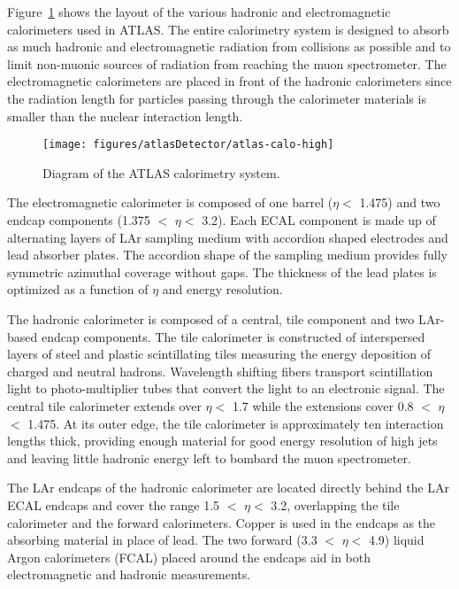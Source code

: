 Figure~\ref{fig:atlasCalorimeters} shows the layout of the various hadronic and electromagnetic calorimeters used in ATLAS. The entire calorimetry system is designed to absorb as much hadronic and electromagnetic radiation from collisions as possible and to limit non-muonic sources of radiation from reaching the muon spectrometer. The electromagnetic calorimeters are placed in front of the hadronic calorimeters since the radiation length for particles passing through the calorimeter materials is smaller than the nuclear interaction length. 

\begin{figure}[h]
\centering
\texttt{[image: figures/atlasDetector/atlas-calo-high]}
\label{fig:atlasCalorimeters}
\caption{Diagram of the ATLAS calorimetry system.}
\end{figure}

The electromagnetic calorimeter is composed of one barrel (\textbar$\eta$\textbar $<$ 1.475) and two endcap components (1.375 $<$ \textbar$\eta$\textbar $<$ 3.2). Each ECAL component is made up of alternating layers of LAr sampling medium with accordion shaped electrodes and lead absorber plates. The accordion shape of the sampling medium provides fully symmetric azimuthal coverage without gaps. The thickness of the lead plates is optimized as a function of $\eta$ and energy resolution. %

The hadronic calorimeter is composed of a central, tile component and two LAr-based endcap components. The tile calorimeter is constructed of interspersed layers of steel and plastic scintillating tiles measuring the energy deposition of charged and neutral hadrons. Wavelength shifting fibers transport scintillation light to photo-multiplier tubes that convert the light to an electronic signal. The central tile calorimeter extends over \textbar$\eta$\textbar $<$ 1.7 while the extensions cover 0.8 $<$ \textbar$\eta$\textbar $<$ 1.475. At its outer edge, the tile calorimeter is approximately ten interaction lengths thick, providing enough material for good energy resolution of high \pt jets and leaving little hadronic energy left to bombard the muon spectrometer.

The LAr endcaps of the hadronic calorimeter are located directly behind the LAr ECAL endcaps and cover the range 1.5 $<$ \textbar$\eta$\textbar $<$ 3.2, overlapping the tile calorimeter and the forward calorimeters. Copper is used in the endcaps as the absorbing material in place of lead. The two forward (3.3 $<$ \textbar$\eta$\textbar $<$ 4.9) liquid Argon calorimeters (FCAL) placed around the endcaps aid in both electromagnetic and hadronic measurements.

